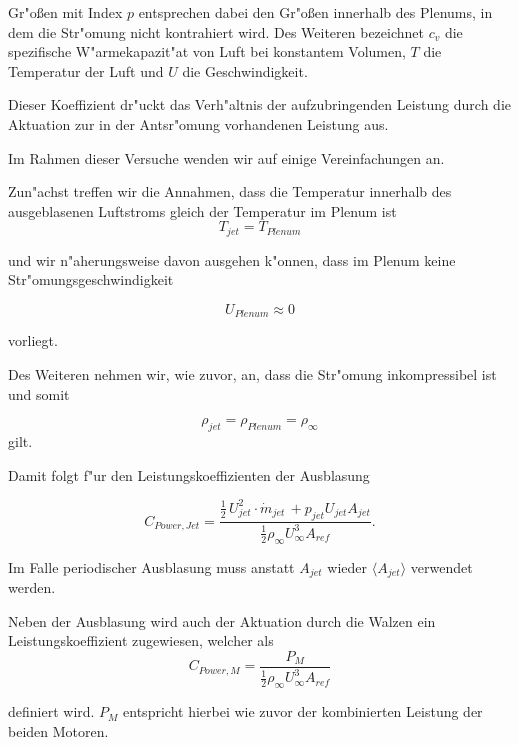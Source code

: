 Gr"o\ss{}en mit Index $p$ entsprechen dabei den Gr"o\ss{}en innerhalb des Plenums, in dem die Str"omung nicht kontrahiert wird.
Des Weiteren bezeichnet $c_v$ die spezifische W"armekapazit"at von Luft bei konstantem Volumen, $T$ die Temperatur der Luft und $U$ die Geschwindigkeit.

Dieser Koeffizient dr"uckt das Verh"altnis der aufzubringenden Leistung durch die Aktuation zur in der Antsr"omung vorhandenen Leistung aus.

Im Rahmen dieser Versuche wenden wir auf  einige Vereinfachungen an. 

Zun"achst treffen wir die Annahmen, dass die Temperatur innerhalb des ausgeblasenen Luftstroms gleich der Temperatur im Plenum ist
	\begin{equation}
	\label{eq:T-Vereinfachung}
		T_{jet} = T_{Plenum}
	\end{equation}

und wir n"aherungsweise davon ausgehen k"onnen, dass im Plenum keine Str"omungsgeschwindigkeit 

	\begin{equation}
	\label{eq:Up}
		U_{Plenum} \approx 0
	\end{equation}

vorliegt.

Des Weiteren nehmen wir, wie zuvor, an, dass die Str"omung inkompressibel ist und somit

	\begin{equation}
	\label{eq:Inkompressibilitaet}
		\rho_{jet} = \rho_{Plenum} = \rho_{\infty}
	\end{equation}
gilt.

Damit folgt f"ur den Leistungskoeffizienten der Ausblasung

	\begin{equation}
	\label{eq:CPowerJ vereinfacht}
		C_{Power,Jet} = \frac{\frac{1}{2}\,U^2_{jet} \cdot \dot{m}_{jet} \, + p_{jet}U_{jet}A_{jet}}{\frac{1}{2}\rho_{\infty}U^3_{\infty}A_{ref}}.
	\end{equation}

Im Falle periodischer Ausblasung muss anstatt $A_{jet}$ wieder $\langle{A_{jet}}\rangle$ verwendet werden.

Neben der Ausblasung wird auch der Aktuation durch die Walzen ein Leistungskoeffizient zugewiesen, welcher als
		\begin{equation}
		\label{eq:def-CPowerM}
			C_{Power,M} = \frac{P_M}{\frac{1}{2}\rho_{\infty}U^3_{\infty}A_{ref}}
		\end{equation}
		
definiert wird.
$P_M$ entspricht hierbei wie zuvor der kombinierten Leistung der beiden Motoren.
